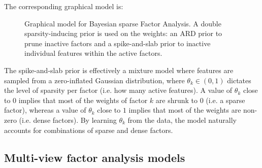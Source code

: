 The corresponding graphical model is:

\begin{figure}[H] \begin{center}
	
	\label{fig:bayesianFA}
	\caption{Graphical model for Bayesian sparse Factor Analysis. A double sparsity-inducing prior is used on the weights: an ARD prior to prune inactive factors and a spike-and-slab prior to inactive individual features within the active factors.}
\end{center} \end{figure}

The spike-and-slab prior is effectively a mixture model where features are sampled from a zero-inflated Gaussian distribution, where $\theta_k \in (0,1)$ dictates the level of sparsity per factor (i.e. how many active features). A value of $\theta_k$ close to $0$ implies that most of the weights of factor $k$ are shrunk to $0$ (i.e. a sparse factor), whereas a value of $\theta_k$ close to $1$ implies that most of the weights are non-zero (i.e. dense factors). By learning $\theta_k$ from the data, the model naturally accounts for combinations of sparse and dense factors.


\subsection{Multi-view factor analysis models}

